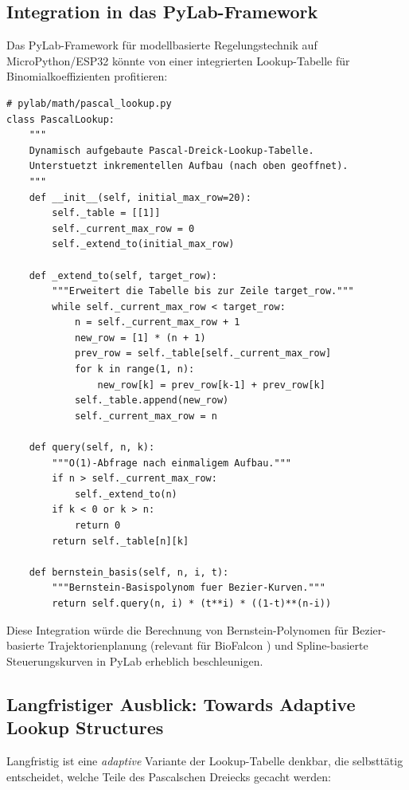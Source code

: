 ﻿\documentclass[12pt, a4paper]{article}
\theoremstyle{plain}
\theoremstyle{definition}
\theoremstyle{remark}
\begin{document}
\subsection{Integration in das PyLab-Framework}

Das PyLab-Framework \cite{epp2026pylab} für modellbasierte Regelungstechnik
auf MicroPython/ESP32 könnte von einer integrierten Lookup-Tabelle für
Binomialkoeffizienten profitieren:

\begin{lstlisting}[caption={Geplante PyLab-Integration: Pascal-Lookup-Modul},
                   label={lst:pylab_integration}]
# pylab/math/pascal_lookup.py
class PascalLookup:
    """
    Dynamisch aufgebaute Pascal-Dreick-Lookup-Tabelle.
    Unterstuetzt inkrementellen Aufbau (nach oben geoffnet).
    """
    def __init__(self, initial_max_row=20):
        self._table = [[1]]
        self._current_max_row = 0
        self._extend_to(initial_max_row)

    def _extend_to(self, target_row):
        """Erweitert die Tabelle bis zur Zeile target_row."""
        while self._current_max_row < target_row:
            n = self._current_max_row + 1
            new_row = [1] * (n + 1)
            prev_row = self._table[self._current_max_row]
            for k in range(1, n):
                new_row[k] = prev_row[k-1] + prev_row[k]
            self._table.append(new_row)
            self._current_max_row = n

    def query(self, n, k):
        """O(1)-Abfrage nach einmaligem Aufbau."""
        if n > self._current_max_row:
            self._extend_to(n)
        if k < 0 or k > n:
            return 0
        return self._table[n][k]

    def bernstein_basis(self, n, i, t):
        """Bernstein-Basispolynom fuer Bezier-Kurven."""
        return self.query(n, i) * (t**i) * ((1-t)**(n-i))
\end{lstlisting}

Diese Integration würde die Berechnung von Bernstein-Polynomen für
Bezier-basierte Trajektorienplanung (relevant für BioFalcon
\cite{epp2026biofalcon}) und Spline-basierte Steuerungskurven in PyLab
erheblich beschleunigen.

\subsection{Langfristiger Ausblick: Towards Adaptive Lookup Structures}

Langfristig ist eine \emph{adaptive} Variante der Lookup-Tabelle
denkbar, die selbsttätig entscheidet, welche Teile des Pascalschen
Dreiecks gecacht werden:
\end{document}

